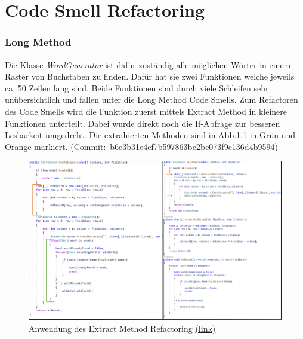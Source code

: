 \chapter{Code Smell Refactoring}

\subsection{Long Method}

Die Klasse \textit{WordGenerator} ist dafür zuständig alle möglichen Wörter in einem Raster von Buchstaben zu finden. Dafür hat sie zwei Funktionen welche jeweils ca. 50 Zeilen lang sind. Beide Funktionen sind durch viele Schleifen sehr unübersichtlich und fallen unter die Long Method Code Smells. Zum Refactoren des Code Smells wird die Funktion zuerst mittels Extract Method in kleinere Funktionen unterteilt. Dabei wurde direkt noch die If-Abfrage zur besseren Lesbarkeit umgedreht. Die extrahierten Methoden sind in Abb.\ref{Abb:ExtractMethod} in Grün und Orange markiert. (Commit:~\href{https://github.com/EinToni/Wortfinder/commit/b6e3b31e4ef7b597863bc2be073f9e136d4b9594}{b6e3b31e4ef7b597863bc2be073f9e136d4b9594})

\begin{figure}[!ht]
  \centering
  \includegraphics[width=\textwidth]{Bilder/ExtractMethod.PNG}
  \caption[Anwendung des Extract Method Refactoring]{Anwendung des Extract Method Refactoring \href{https://github.com/EinToni/WortfinderDoku/blob/main/Bilder/ExtractMethod.png}{(link)}}
  \label{Abb:ExtractMethod}
\end{figure}

